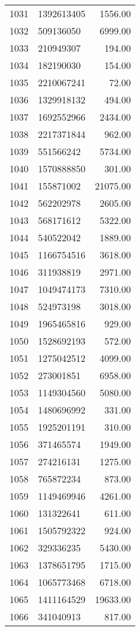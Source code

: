 \begin{table}[ht]
\begin{tabular}{rlr}
  1031 & 1392613405 & 1556.00 \\ 
  1032 & 509136050 & 6999.00 \\ 
  1033 & 210949307 & 194.00 \\ 
  1034 & 182190030 & 154.00 \\ 
  1035 & 2210067241 & 72.00 \\ 
  1036 & 1329918132 & 494.00 \\ 
  1037 & 1692552966 & 2434.00 \\ 
  1038 & 2217371844 & 962.00 \\ 
  1039 & 551566242 & 5734.00 \\ 
  1040 & 1570888850 & 301.00 \\ 
  1041 & 155871002 & 21075.00 \\ 
  1042 & 562202978 & 2605.00 \\ 
  1043 & 568171612 & 5322.00 \\ 
  1044 & 540522042 & 1889.00 \\ 
  1045 & 1166754516 & 3618.00 \\ 
  1046 & 311938819 & 2971.00 \\ 
  1047 & 1049474173 & 7310.00 \\ 
  1048 & 524973198 & 3018.00 \\ 
  1049 & 1965465816 & 929.00 \\ 
  1050 & 1528692193 & 572.00 \\ 
  1051 & 1275042512 & 4099.00 \\ 
  1052 & 273001851 & 6958.00 \\ 
  1053 & 1149304560 & 5080.00 \\ 
  1054 & 1480696992 & 331.00 \\ 
  1055 & 1925201191 & 310.00 \\ 
  1056 & 371465574 & 1949.00 \\ 
  1057 & 274216131 & 1275.00 \\ 
  1058 & 765872234 & 873.00 \\ 
  1059 & 1149469946 & 4261.00 \\ 
  1060 & 131322641 & 611.00 \\ 
  1061 & 1505792322 & 924.00 \\ 
  1062 & 329336235 & 5430.00 \\ 
  1063 & 1378651795 & 1715.00 \\ 
  1064 & 1065773468 & 6718.00 \\ 
  1065 & 1411164529 & 19633.00 \\ 
  1066 & 341040913 & 817.00 \\ 

\end{tabular}
\end{table}
